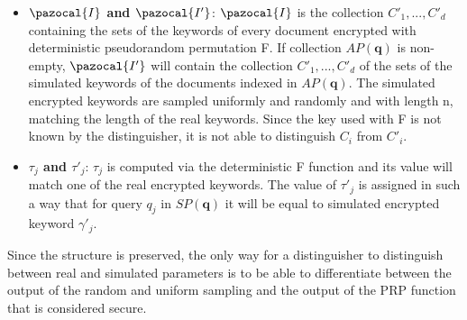 \begin{itemize}
    \item \textbf{$\pazocal{I}$ and $\pazocal{I'}$}: $\pazocal{I}$ is the collection ${C'_1,...,C'_d}$ containing the sets of the keywords of every document encrypted with deterministic pseudorandom permutation F. If collection $AP(\textbf{q})$ is non-empty, $\pazocal{I'}$ will contain the collection ${C'_1,...,C'_d}$ of the sets of the simulated keywords of the documents indexed in $AP(\textbf{q})$. The simulated encrypted keywords are sampled uniformly and randomly and with length n, matching the length of the real keywords. Since the key used with F is not known by the distinguisher, it is not able to distinguish $C_i$ from $C'_i$.
    \item \textbf{$\tau _j$ and $\tau '_j$}: $\tau _j$ is computed via the deterministic F function and its value will match one of the real encrypted keywords. The value of $\tau '_j$ is assigned in such a way that for query $q_j$ in $SP(\textbf{q})$ it will be equal to simulated encrypted keyword $\gamma '_j$. 
\end{itemize}

Since the structure is preserved, the only way for a distinguisher to distinguish between real and simulated parameters is to be able to differentiate between the output of the random and uniform sampling and the output of the PRP function that is considered secure.